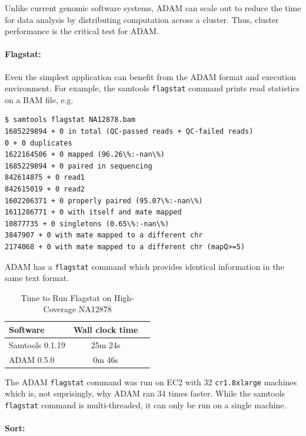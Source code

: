 \documentclass[10pt,twocolumn]{article}
\theoremstyle{plain}
\begin{document}
Unlike current genomic software systems, ADAM can scale out to reduce the time
for data analysis by distributing computation across a cluster. Thus, cluster performance is the critical test for ADAM.

\paragraph{Flagstat:}
\label{sec:flagstat}

Even the simplest application can benefit from the ADAM format and execution
environment. For example, the samtools \texttt{flagstat} command prints
read statistics on a BAM file, e.g.

\begin{scriptsize}
\begin{verbatim}
$ samtools flagstat NA12878.bam
1685229894 + 0 in total (QC-passed reads + QC-failed reads)
0 + 0 duplicates
1622164506 + 0 mapped (96.26\%:-nan\%)
1685229894 + 0 paired in sequencing
842614875 + 0 read1
842615019 + 0 read2
1602206371 + 0 properly paired (95.07\%:-nan\%)
1611286771 + 0 with itself and mate mapped
10877735 + 0 singletons (0.65\%:-nan\%)
3847907 + 0 with mate mapped to a different chr
2174068 + 0 with mate mapped to a different chr (mapQ>=5)
\end{verbatim}
\end{scriptsize}

ADAM has a \texttt{flagstat} command which provides 
identical information in the same text format.

\begin{table}[h]
\caption{Time to Run Flagstat on High-Coverage NA12878}
\label{tab:time-flagstat}
\begin{center}
\begin{tabular}{| l | c | c |}
\hline
\bf Software  & \bf Wall clock time \\
\hline
Samtools 0.1.19 & 25m 24s \\
ADAM 0.5.0 & 0m 46s \\
\hline
\end{tabular}
\end{center}
\end{table}

The ADAM \texttt{flagstat} command was run on EC2 with 32 \texttt{cr1.8xlarge} machines
which is, not suprisingly, why ADAM ran 34 times faster. While the samtools \texttt{flagstat}
command is multi-threaded, it can only be run on a single machine.

\paragraph{Sort:}
\label{sec:sort}
\end{document}
